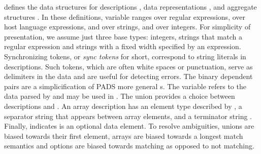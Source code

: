 
 defines
the data structures for descriptions , data
representations , and aggregate structures .
In these definitions,  variable  ranges over regular expressions,
 over host language expressions,
 and  over strings, and  over integers.
For simplicity of presentation, we assume just three base types: 
integers, strings that match a regular expression and strings with a
fixed width specified by an expression. Synchronizing
tokens, or {\em sync tokens} for short, correspond to string literals
in \pads{} descriptions.  Such tokens, which are often
white spaces or punctuation,
serve as delimiters in the data and are useful for detecting
errors. The binary dependent pairs  are
a simplicification of PADS more general s. 
The variable  refers to the data parsed by 
and may be used in . The union 
provides a choice between descriptions  and .
An array description
 has an element type described by , a separator
string  that appears between array elements, and a
terminator string . Finally,  indicates  is 
an optional data element.  To resolve ambiguities, unions are
biased towards their first element, arrays are biased towards a longest match
semantics and options are biased towards matching as opposed to not matching.

